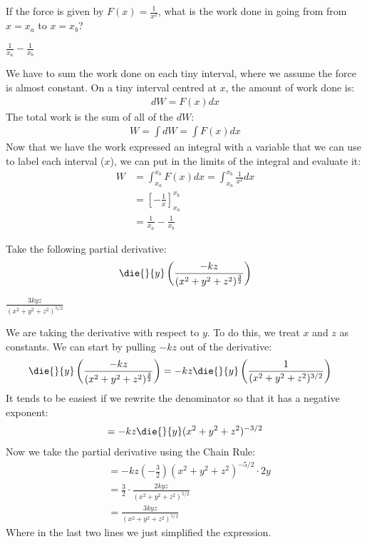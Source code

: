 If the force is given by $F(x)=\frac{1}{x^2}$, what is the work done in going from from $x=x_a$ to $x=x_b$?
\begin{finalanswer}
$\frac{1}{x_a}-\frac{1}{x_b}$
\end{finalanswer}
\begin{solution}
We have to sum the work done on each tiny interval, where we assume the force is almost constant. On a tiny interval centred at $x$, the amount of work done is:
\begin{align*}
dW = F(x) dx
\end{align*}
The total work is the sum of all of the $dW$:
\begin{align*}
W = \int dW = \int F(x)dx
\end{align*}
Now that we have the work expressed an integral with a variable that we can use to label each interval ($x$), we can put in the limits of the integral and evaluate it:
\begin{align*}
W &= \int_{x_a}^{x_b} F(x)dx=\int_{x_a}^{x_b} \frac{1}{x^2}dx\\
&=\left[-\frac{1}{x}\right]_{x_a}^{x_b}\\
&=\frac{1}{x_a}-\frac{1}{x_b}
\end{align*}

\end{solution}
\question Take the following partial derivative:
\begin{align*}
\die{}{y}\left(\frac{-kz}{(x^2+y^2+z^2)^\frac{3}{2}}\right)
\end{align*}
\begin{finalanswer}
$\frac{3kyz}{(x^2+y^2+z^2)^{5/2}}$
\end{finalanswer}
\begin{solution}
We are taking the derivative with respect to $y$. To do this, we treat $x$ and $z$ as constants. We can start by pulling $-kz$ out of the derivative:
\begin{align*}
\die{}{y}\left(\frac{-kz}{(x^2+y^2+z^2)^\frac{3}{2}}\right)&=-kz\die{}{y}\left(\frac{1}{(x^2+y^2+z^2)^{3/2}}\right)
\end{align*}
It tends to be easiest if we rewrite the denominator so that it has a negative exponent:
\begin{align*}
=-kz\die{}{y}(x^2+y^2+z^2)^{-3/2}
\end{align*}
Now we take the partial derivative using the Chain Rule:
\begin{align*}
&=-kz(-\frac{3}{2})(x^2+y^2+z^2)^{-5/2} \cdot 2y\\
&=\frac{3}{2}\cdot \frac{2kyz}{(x^2+y^2+z^2)^{5/2}}\\
&=\frac{3kyz}{(x^2+y^2+z^2)^{5/2}}
\end{align*}
Where in the last two lines we just simplified the expression.
\end{solution}


